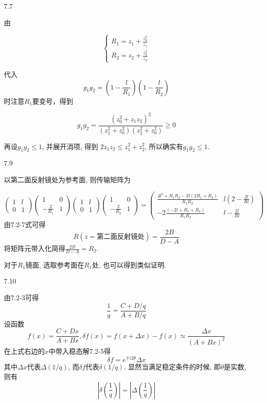 7.7

由


$$
\left\{\begin{array}{l}{R_{1}=z_{1}+\frac{z_{0}^{2}}{z_{1}}} \\ {R_{2}=z_{2}+\frac{z_{0}^{2}}{z_{2}}}\end{array}\right. 
$$

代入
$$
g_{1} g_{2}=\left(1-\frac{l}{R_{1}}\right)\left(1-\frac{l}{R_{2}}\right)
$$
时注意$R_1$要变号，得到

\[g_{1} g_{2}=\frac{\left(z_{0}^{2}+z_{1} z_{2}\right)^{2}}{\left(z_{1}^{2}+z_{0}^{2}\right)\left(z_{2}^{2}+z_{0}^{2}\right)} \geqslant 0 \]

再设\(g_{1} g_{2} \leqslant 1\), 并展开消项, 得到
\(2 z_{1} z_{2} \leqslant z_{1}^{2}+z_{2}^{2}\), 
所以确实有\(g_{1} g_{2} \leqslant 1\).

7.9

以第二面反射镜处为参考面, 则传输矩阵为

\[
\left(\begin{array}{ll}{1} & {l} \\ {0} & {1}\end{array}\right)
\left(\begin{array}{cc}{1} & {0} \\ {-\frac{2}{R_{1}}} & {1}\end{array}\right)
\left(\begin{array}{ll}{1} & {l} \\ {0} & {1}\end{array}\right)
\left(\begin{array}{cc}{1} & {0} \\ {-\frac{2}{R_{2}}} & {1}\end{array}\right)
=\left(\begin{array}{ll}{\frac{4 l^{2}+R_{1} R_{2}-2 l\left(2 R_{1}+R_{2}\right)}{R_{1} R_{2}}} 
& {l\left(2-\frac{2 l}{R l}\right)} \\ 
{-2 \frac{\left(-2 l+R_{1}+R_{2}\right)}{R_{1} R_{2}}} 
& {l-\frac{2 l}{R l}}\end{array}\right) 
\]
由7.2-7式可得
$$
R(z=\text{第二面反射镜处})=\frac{2B}{D-A}
$$
将矩阵元带入化简得\(\frac{2B}{D-A}=R_2\). 

对于\(R_1\)镜面, 选取参考面在\(R_1\)处, 也可以得到类似证明.

7.10

由7.2-3可得
\[\frac{1}{q}=\frac{C+D /q}{A+B/q} \]
设函数
\[
f(x)=\frac{C+D x}{A+B x}, \delta f(x)=f(x+\Delta x)-f(x) \simeq \frac{\Delta x}{(A+B x)^{2}} 
\]
在上式右边的\(x\)中带入稳态解7.2-5得
\[
\delta f=e^{\mp i2 \theta}\Delta x 
\]
其中\(\Delta x\)代表\(\Delta(1/q)\), 而\(\delta f\)代表\(\delta(1/q)\). 显然当满足稳定条件的时候, 即\(\theta\)是实数, 则有
\[\left|\delta\left(\frac{1}{q}\right)\right|=\left|\Delta\left(\frac{1}{q}\right)\right| \]












